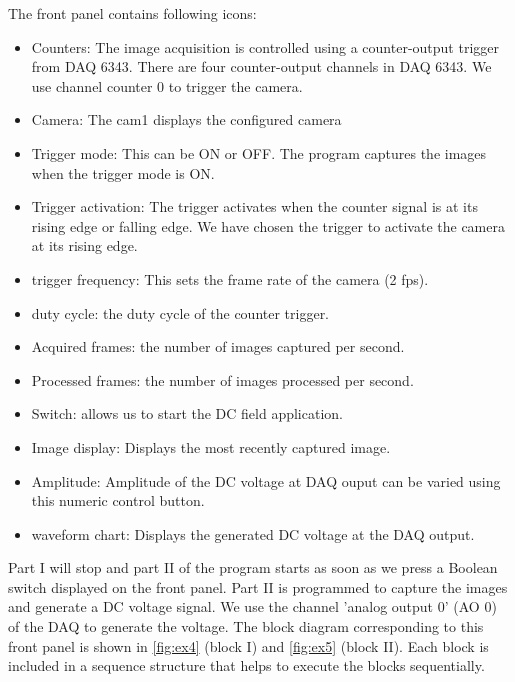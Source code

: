 \documentclass[journal=jacsat,manuscript=article]{achemso}
\begin{document}
The front panel contains following icons:
\begin{itemize}
  \item Counters: The image acquisition is controlled using a counter-output trigger
from DAQ 6343. There are four counter-output channels in DAQ 6343. We
use channel counter 0 to trigger the camera.

 \item Camera: The cam1 displays the configured
   camera

   \item Trigger mode: This can be ON or OFF. The program captures the
     images when the trigger mode is ON.  
     \item Trigger activation: The trigger activates
       when the counter signal is at its rising edge or falling edge. We have
       chosen the trigger to activate the camera at its rising edge.
       
     \item trigger frequency: This sets the frame rate of the camera (2 fps).

 \item duty cycle:  the duty cycle of the
   counter trigger.
 \item Acquired frames: the number of images captured per second.
   \item Processed frames:  the number of images
     processed per second.
     \item Switch: allows us to start the DC field application.
     \item Image display: Displays the most recently captured image.
     \item Amplitude: Amplitude of the DC voltage at DAQ ouput can be varied using this numeric control button.
     \item waveform chart: Displays the generated DC voltage at the DAQ output.
\end{itemize}

Part I will stop and part II of the program starts as soon as we press a Boolean switch displayed on the front panel. Part II is programmed to capture the images and generate a DC voltage signal. We use the channel 'analog output 0' (AO 0) of the DAQ to generate the voltage. 
The block diagram corresponding to this front panel is shown in \ref{fig:ex4} (block I) and \ref{fig:ex5} (block II). 
Each block is included in a sequence structure that helps to execute the blocks sequentially.
 
\end{document}
